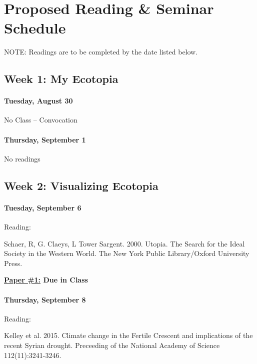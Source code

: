 \clearpage
\section{Proposed Reading \& Seminar Schedule}

NOTE: Readings are to be completed by the date listed below.

\subsection{\textbf{Week 1}: My Ecotopia}

\paragraph{Tuesday, August 30} No Class -- Convocation

\paragraph{Thursday, September 1} No readings

\subsection{\textbf{Week 2}: Visualizing Ecotopia}
      
\paragraph{Tuesday, September 6}Reading:
  \begin{itemize*}
      \item Schaer, R, G. Claeys, L Tower Sargent. 2000. Utopia. The Search for the Ideal Society in the Western World. The New York Public Library/Oxford University Press.
  \end{itemize*}
    
\textbf{\underline{Paper \#1:} Due in Class}

\paragraph{Thursday, September 8}Reading:  

      \begin{itemize*}
      \item Kelley et al. 2015. Climate change in the Fertile Crescent and implications of the recent Syrian drought. Preceeding of the National Academy of Science 112(11):3241-3246.
      \end{itemize*}
      
